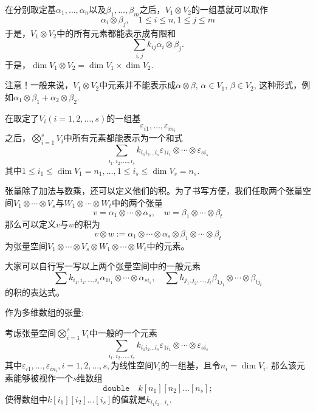 在分别取定基$\alpha_1,\ldots,\alpha_n$以及$\beta_1,\ldots,\beta_m$之后，$V_1\otimes V_2$的一组基就可以取作
$$\alpha_i\otimes \beta_j, \quad 1\leqslant i\leqslant n, 1\leqslant j\leqslant m$$
于是，$V_1\otimes V_2$中的所有元素都能表示成有限和
$$\sum\limits_{i,j} k_{ij} \alpha_i\otimes \beta_j.$$
于是，$\dim V_1\otimes V_2 = \dim V_1 \times \dim V_2.$

{\color{red}注意}！一般来说，$V_1\otimes V_2$中元素并不能表示成$\alpha\otimes\beta$, $\alpha\in V_1$, $\beta\in V_2$, 这种形式，例如$\alpha_1\otimes \beta_1 + \alpha_2\otimes\beta_2$.

在取定了$V_i (i=1,2,\ldots,s)$的一组基
$$\varepsilon_{i1},\ldots,\varepsilon_{in_i}$$
之后，$\bigotimes\limits_{i=1}^s V_i$中所有元素都能表示为一个和式
$$\sum\limits_{i_1,i_2,\ldots,i_s} k_{i_1i_2\ldots i_s} \varepsilon_{1i_1} \otimes \cdots \otimes \varepsilon_{si_s}$$
其中$1\leqslant i_1\leqslant \dim V_1 = n_1, \ldots, 1\leqslant i_s\leqslant \dim V_s = n_s$.

张量除了加法与数乘，还可以定义他们的积。为了书写方便，我们任取两个张量空间$V_1\otimes\cdots\otimes V_s$与$W_1\otimes\cdots\otimes W_t$中的两个张量
$$v = \alpha_1\otimes\cdots\otimes \alpha_s, \quad w = \beta_1\otimes\cdots\otimes \beta_t$$
那么可以定义$v$与$w$的积为
$$v\otimes w := \alpha_1\otimes\cdots\otimes \alpha_s \otimes \beta_1\otimes\cdots\otimes \beta_t$$
为张量空间$V_1\otimes\cdots\otimes V_s\otimes W_1\otimes\cdots\otimes W_t$中的元素。

大家可以自行写一写以上两个张量空间中的一般元素
$$\sum k_{i_1,i_2,\ldots,i_s}\alpha_{1i_1} \otimes \cdots \otimes \alpha_{si_s}, \quad \sum h_{j_1,j_2,\ldots,j_t}\beta_{1j_1} \otimes \cdots \otimes \beta_{tj_t}$$
的积的表达式。

作为多维数组的张量:

考虑张量空间$\bigotimes\limits_{i=1}^s V_i$中一般的一个元素
$$\sum\limits_{i_1,i_2,\ldots,i_s} k_{i_1i_2\ldots i_s} \varepsilon_{1i_1} \otimes \cdots \otimes \varepsilon_{si_s}$$
其中$\varepsilon_{i1},\ldots,\varepsilon_{in_i}, i=1,2,\ldots,s,$为线性空间$V_i $的一组基，且令$n_i = \dim V_i$. 那么该元素能够被视作一个$s$维数组
$$
\texttt{double} \quad k[n_1][n_2]...[n_s];
$$
使得数组中$k[i_1][i_2]...[i_s]$的值就是$k_{i_1i_2\ldots i_s}$.


